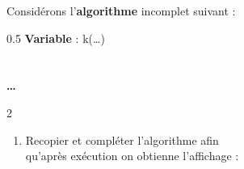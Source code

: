 \begin{boxexstheorieligne}\renewcommand{\eexo}{\vspace{8mm}}
\exo
Considérons l'{\bf algorithme} incomplet suivant :

\vspace{4mm}
\begin{center}
\begin{affichagealgorithme}{0.5}
\textbf{Variable} : k(\ldots)\\
\\
\\
\textbf{\ldots\phantom{P}}
\end{affichagealgorithme}
\end{center}


%
%
%

\begin{multicols}{2}\columnsep=10mm
\begin{enumerate}[label=\alph*),left=0mm]
\item Recopier et compléter l'algorithme afin\\ qu'après exécution on obtienne l'affichage :


\end{enumerate}
\end{multicols}
\end{boxexstheorieligne}
